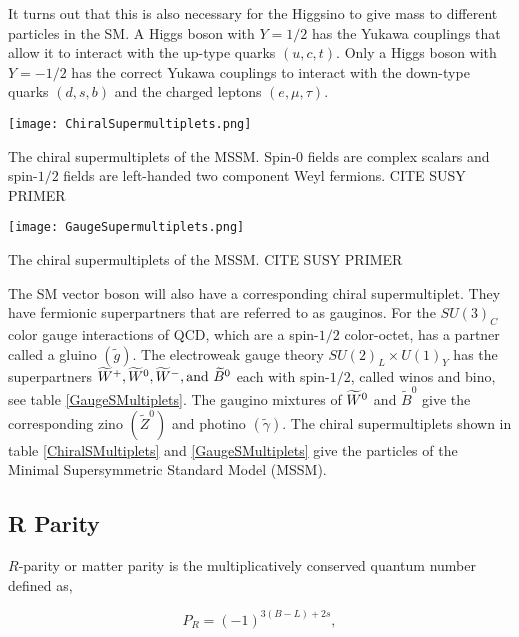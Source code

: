 It turns out that this is also necessary for the Higgsino to give mass to different particles in the SM. A Higgs boson with $Y=1/2$ has the Yukawa couplings that allow it to interact with the up-type quarks $(u, c, t)$. Only a Higgs boson with $Y=-1/2$ has the correct Yukawa couplings to interact with the down-type quarks $(d, s, b)$ and the charged leptons $(e, \mu, \tau)$.

\begin{table}
 	\centering
	\texttt{[image: ChiralSupermultiplets.png]}
 	\caption{The chiral supermultiplets of the MSSM. Spin-0 fields are complex scalars and spin-$1/2$ fields are left-handed two component Weyl fermions. CITE SUSY PRIMER}
 	\label{ChiralSMultiplets} 
\end{table}

\begin{table}
 	\centering
	\texttt{[image: GaugeSupermultiplets.png]}
 	\caption{The chiral supermultiplets of the MSSM. CITE SUSY PRIMER}
 	\label{GaugeSMultiplets} 
\end{table}

The SM vector boson will also have a corresponding chiral supermultiplet. They have fermionic superpartners that are referred to as gauginos. For the $SU(3)_C$ color gauge interactions of QCD, which are a spin-$1/2$ color-octet, has a partner called a gluino $(\widetilde{g})$. The electroweak gauge theory $SU(2)_L\times U(1)_Y$ has the superpartners $\widetilde{W}^+,\widetilde{W}^0, \widetilde{W}^-, \text{and } \widetilde{B}^0$ each with spin-$1/2$, called winos and bino, see table \ref{GaugeSMultiplets}. The gaugino mixtures of $\widetilde{W}^0$ and $\widetilde{B}^0$ give the corresponding zino $(\widetilde{Z}^0)$ and photino $(\widetilde{\gamma})$. The chiral supermultiplets shown in table \ref{ChiralSMultiplets} and \ref{GaugeSMultiplets} give the particles of the Minimal Supersymmetric Standard Model (MSSM). 

\subsection{R Parity}
\label{subsec:rparity}

$R$-parity or matter parity is the multiplicatively conserved quantum number defined as, 

\begin{equation} \label{RParity}
P_R=(-1)^{3(B-L)+2s}, 
\end{equation}

